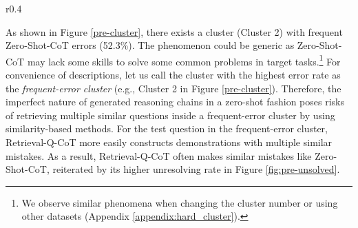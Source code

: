 \begin{wrapfigure}{r}{0.4\textwidth}
    \centering
    {
\pgfplotsset{width=6.7cm, height=4.5cm}
    \vspace{-2mm}
    \caption{Clusters of similar questions.\label{pre-cluster}}
}
\end{wrapfigure}

As shown in Figure \ref{pre-cluster}, there exists a cluster (Cluster 2) with frequent Zero-Shot-CoT errors (52.3\%).
The phenomenon could be generic as Zero-Shot-CoT may lack some skills to solve some common problems in target tasks.\footnote{We observe  similar phenomena when changing the cluster number or using other datasets (Appendix \ref{appendix:hard_cluster}).}
For convenience of descriptions, let us call the cluster with the highest error rate as the \emph{frequent-error cluster} (e.g., Cluster 2 in Figure \ref{pre-cluster}). Therefore, the imperfect nature of generated reasoning chains in a zero-shot fashion
poses risks of retrieving multiple similar questions inside a frequent-error cluster by using similarity-based methods. 
For the test question in the frequent-error cluster, Retrieval-Q-CoT more easily constructs demonstrations with multiple similar mistakes. As a result, Retrieval-Q-CoT often makes similar mistakes like Zero-Shot-CoT, reiterated by its higher unresolving rate in Figure \ref{fig:pre-unsolved}.

